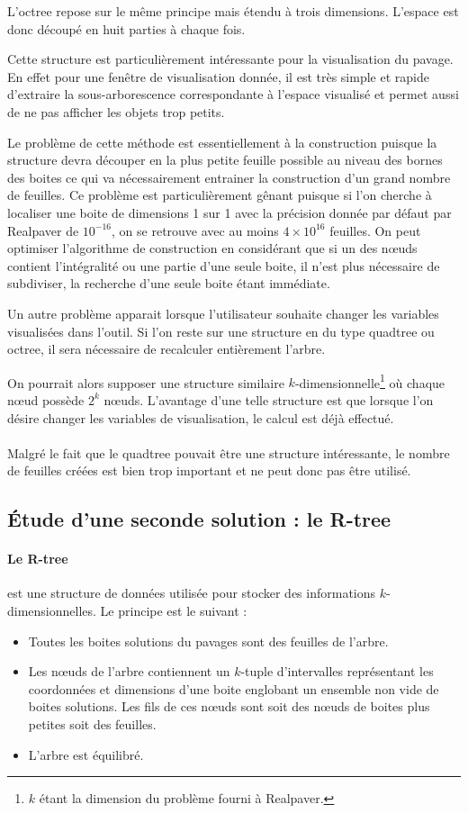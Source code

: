 \documentclass[11pt,a4paper,utf8x]{report}
\begin{document}
L'octree repose sur le même principe mais étendu à trois dimensions. L'espace est donc découpé en huit parties à chaque fois.

Cette structure est particulièrement intéressante pour la visualisation du pavage. En effet pour une fenêtre de visualisation donnée, il est très simple et rapide d'extraire la sous-arborescence correspondante à l'espace visualisé et permet aussi de ne pas afficher les objets trop petits.

Le problème de cette méthode est essentiellement à la construction puisque la structure devra découper en la plus petite feuille possible au niveau des bornes des boites ce qui va nécessairement entrainer la construction d'un grand nombre de feuilles. Ce problème est particulièrement gênant puisque si l'on cherche à localiser une boite de dimensions 1 sur 1 avec la précision donnée par défaut par Realpaver de $10^{-16}$, on se retrouve avec au moins $4 \times 10^{16}$ feuilles. On peut optimiser l'algorithme de construction en considérant que si un des nœuds contient l'intégralité ou une partie d'une seule boite, il n'est plus nécessaire de subdiviser, la recherche d'une seule boite étant immédiate.

Un autre problème apparait lorsque l'utilisateur souhaite changer les variables visualisées dans l'outil. Si l'on reste sur une structure en du type quadtree ou octree, il sera nécessaire de recalculer entièrement l'arbre.

On pourrait alors supposer une structure similaire $k$-dimensionnelle\footnote{$k$ étant la dimension du problème fourni à Realpaver.} où chaque nœud possède $2^k$ nœuds. L'avantage d'une telle structure est que lorsque l'on désire changer les variables de visualisation, le calcul est déjà effectué.

\paragraph{} Malgré le fait que le quadtree pouvait être une structure intéressante, le nombre de feuilles créées est bien trop important et ne peut donc pas être utilisé.

\subsection{\'Etude d'une seconde solution : le R-tree}
\paragraph{Le R-tree} est une structure de données utilisée pour stocker des informations $k$-dimensionnelles. Le principe est le suivant :
\begin{itemize}
 \item Toutes les boites solutions du pavages sont des feuilles de l'arbre.
 \item Les nœuds de l'arbre contiennent un $k$-tuple d'intervalles représentant les coordonnées et dimensions d'une boite englobant un ensemble non vide de boites solutions. Les fils de ces nœuds sont soit des nœuds de boites plus petites soit des feuilles.
 \item L'arbre est équilibré.
\end{itemize}
\end{document}
